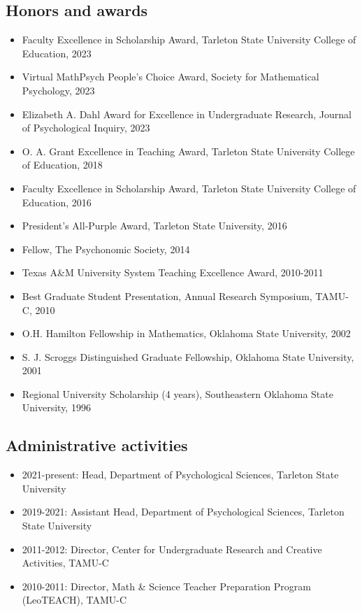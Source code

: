 \documentclass[article,10pt]{article}
\begin{document}
\subsection*{Honors and awards}
\label{sec:orgb04a9d1}
\begin{itemize}
\item Faculty Excellence in Scholarship Award, Tarleton State University College of Education, 2023
\item Virtual MathPsych People's Choice Award, Society for Mathematical Psychology, 2023
\item Elizabeth A. Dahl Award for Excellence in Undergraduate Research, Journal of Psychological Inquiry, 2023
\item O. A. Grant Excellence in Teaching Award, Tarleton State University College of Education, 2018
\item Faculty Excellence in Scholarship Award, Tarleton State University College of Education, 2016
\item President's All-Purple Award, Tarleton State University, 2016
\item Fellow, The Psychonomic Society, 2014
\item Texas A\&M University System Teaching Excellence Award, 2010-2011
\item Best Graduate Student Presentation, Annual Research Symposium, TAMU-C, 2010
\item O.H. Hamilton Fellowship in Mathematics, Oklahoma State University, 2002
\item S. J. Scroggs Distinguished Graduate Fellowship, Oklahoma State University, 2001
\item Regional University Scholarship (4 years), Southeastern Oklahoma State University, 1996
\end{itemize}

\subsection*{Administrative activities}
\label{sec:orgaa8e34c}
\begin{itemize}
\item 2021-present: Head, Department of Psychological Sciences, Tarleton State University
\item 2019-2021: Assistant Head, Department of Psychological Sciences, Tarleton State University
\item 2011-2012: Director, Center for Undergraduate Research and Creative Activities, TAMU-C
\item 2010-2011: Director, Math \& Science Teacher Preparation Program (LeoTEACH), TAMU-C
\end{itemize}
\end{document}
